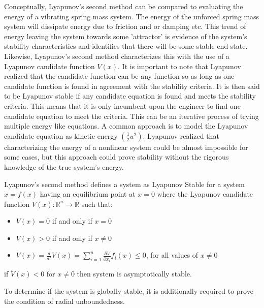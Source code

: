 Conceptually, Lyapunov's second method can be compared to evaluating the energy of a vibrating spring mass system.  The energy of the unforced spring mass system will dissipate energy due to friction and or damping etc.  This trend of energy leaving the system towards some 'attractor' is evidence of the system's stability characteristics and identifies that there will be some stable end state.  Likewise, Lyapunov's second method characterizes this with the use of a Lyapunov candidate function $V(x)$.  It is important to note that Lyapunov realized that the candidate function can be any function so as long as one candidate function is found in agreement with the stability criteria.  It is then said to be Lyapunov stable if any candidate equation is found and meets the stability criteria.  This means that it is only incumbent upon the engineer to find one candidate equation to meet the criteria.  This can be an iterative process of trying multiple energy like equations.  A common approach is to model the Lyapunov candidate equation as kinetic energy $(\frac{1}{2}u^2)$.  Lyapunov realized that characterizing the energy of a nonlinear system could be almost impossible for some cases, but this approach could prove stability without the rigorous knowledge of the true system's energy.

Lyapunov's second method defines a system as Lyapunov Stable for a system $\dot{x}=f(x)$ having an equilibrium point at $x=0$ where the Lyapunov candidate function $V(x):\mathbb{R}^n \rightarrow \mathbb{R}$ such that:
\begin{itemize}
 \item $V(x)=0$ if and only if $x=0$
 \item $V(x)>0$ if and only if $x\neq0$
 \item $\dot{V}(x)=\frac{d}{dt}V(x)=\sum\limits_{i=1}^{n} \frac{\partial V}{\partial x_i}f_i(x) \leq 0$, for all values of $x\neq 0$  
\end{itemize}

if $\dot{V}(x) < 0$ for $x\neq 0$ then system is asymptotically stable.

To determine if the system is globally stable, it is additionally required to prove the condition of radial unboundedness.















